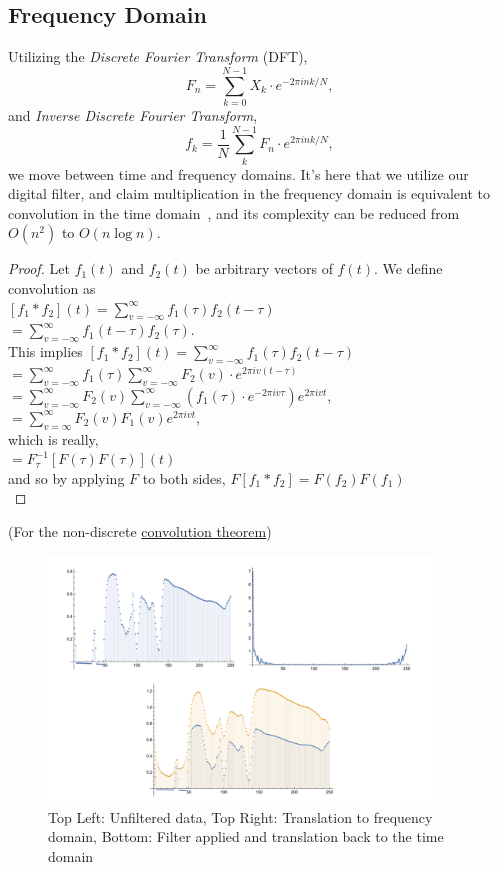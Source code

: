 \documentclass[twoside, 12pt]{article}
\theoremstyle{plain}
\begin{document}
\subsection{Frequency Domain}
Utilizing the \textit{Discrete Fourier Transform} (DFT), $$F_n=\sum_{k=0}^{N-1}X_k  \cdot  e^{-2\pi i n k/N},$$
and \textit{Inverse Discrete Fourier Transform},
$$f_k=\frac{1}{N}\sum_{k}^{N-1}F_n\cdot e^{2\pi i n k/N},$$
we move between time and frequency domains. It's here that we utilize our digital filter, and claim multiplication in the frequency domain is equivalent to convolution in the time domain~\cite{orfanidis_introduction_1996-1}, and its complexity can be reduced from $O(n^2)$ to $O(n\log{n})$.
\begin{proof}
  \normalfont Let $f_1(t)$ and $f_2(t)$ be arbitrary vectors of $f(t)$. We define convolution as\\ $[f_1*f_2](t) = \sum_{v=-\infty}^{\infty}f_1(\tau)f_2(t-\tau)$\\
  $=\sum_{v=-\infty}^{\infty}f_1(t-\tau)f_2(\tau)$.\\
  This implies $[f_1*f_2](t) = \sum_{v=-\infty}^{\infty}f_1(\tau)f_2(t-\tau)$\\
  $=\sum_{v=-\infty}^{\infty}f_1(\tau)\sum_{v=-\infty}^{\infty}F_2(v)\cdot e^{2\pi i v(t-\tau)}$\\
  $=\sum_{v=-\infty}^{\infty}F_2(v)\sum_{v=-\infty}^{\infty}(f_1(\tau)\cdot e^{-2\pi i v\tau})e^{2\pi i v t}$,\\
  $=\sum_{v=\infty}^{\infty}F_{2}(v)F_{1}(v)e^{2\pi i v t}$,\\
  which is really,\\
  $=F_\tau^{-1}[F(\tau) F(\tau)](t)$\\
  and so by applying $F$ to both sides,
  $F[f_1*f_2]=F(f_2) F(f_1)$\\
\end{proof}
(For the non-discrete \href{http://mathworld.wolfram.com/ConvolutionTheorem.html}{convolution theorem})

\begin{figure}[ht]
  \centering
  \includegraphics[width=4in]{Fourier.pdf}
  \caption{Top Left: Unfiltered data, Top Right: Translation to frequency domain, Bottom: Filter applied and translation back to the time domain}
  \label{fig:Fourier}
\end{figure}
\end{document}
